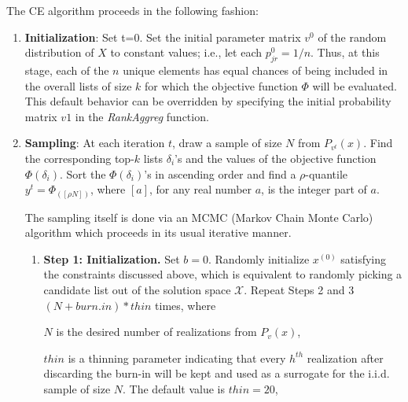 \documentclass[11pt]{article}
\begin{document}
        \noindent The CE algorithm proceeds in the following fashion:
        \begin{enumerate}
        \item{\textbf{Initialization}: Set t=0. Set the initial parameter matrix $v^0$ of the random
        distribution of $X$ to constant values; i.e., let each $p_{jr}^0=1/n$. Thus, at this
        stage, each of the $n$ unique elements has equal chances of being included in the overall lists of size
        $k$ for which the objective function $\Phi$ will be evaluated. This default behavior can
        be overridden by specifying the initial probability matrix $v1$ in the \emph{RankAggreg} function.}
        \item{\textbf{Sampling}: At each iteration $t$, draw a sample of size $N$ from $P_{v^t}(x)$. Find
        the corresponding top-$k$ lists $\delta_i$'s and the values of the objective
        function $\Phi(\delta_i)$. Sort the $\Phi(\delta_i)$'s in ascending
        order and find a $\rho$-quantile $y^t=\Phi_{([\rho N])}$, where $[a]$, for any
        real number $a$, is the integer part of $a$.}

        The sampling itself is done via an MCMC (Markov Chain Monte
        Carlo) algorithm which proceeds in its usual iterative manner.
        \begin{enumerate}
        \item{\textbf{Step 1: Initialization.} Set $b=0$. Randomly initialize $x^{(0)}$
        satisfying the constraints discussed above, which is
        equivalent to randomly picking a candidate list out of the
        solution space $\mathcal{X}$. Repeat Steps 2 and 3 $(N+burn.in)*thin$
        times, where

        \hspace{1cm}$N$ is the desired number of realizations from $P_v(x)$,

        \hspace{1cm}$thin$ is a thinning parameter indicating that every $h^{th}$
        realization after discarding the burn-in will be kept and
        used as a surrogate for the i.i.d. sample of size
        $N$. The default value is $thin=20$,
        
}
\end{enumerate}
\end{enumerate}
\end{document}
